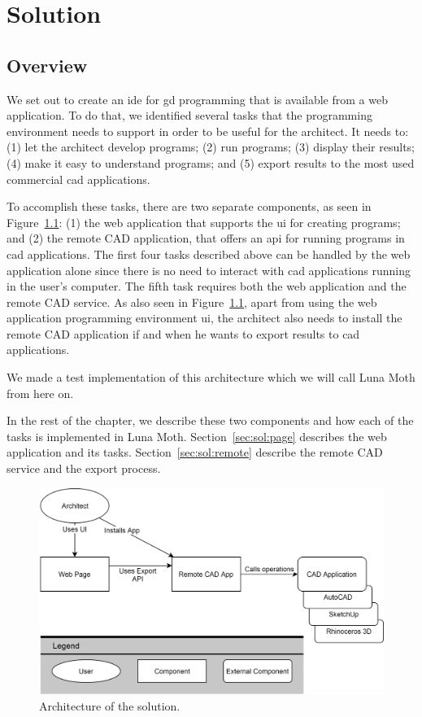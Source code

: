 
\chapter{Solution}
\label{chapter:solution}


\section{Overview}
We set out to create an \gls{ide} for \gls{gd} programming that is available from a web application.
To do that, we identified several tasks that the programming environment needs to support in order to be useful for the architect.
It needs to:
(1) let the architect develop programs;
(2) run programs;
(3) display their results;
(4) make it easy to understand programs;
and (5) export results to the most used commercial \gls{cad} applications.

To accomplish these tasks, there are two separate components, as seen in Figure~\ref{fig:archi:sol}: (1) the web application that supports the \gls{ui} for creating programs; and (2) the remote CAD application, that offers an \gls{api} for running programs in \gls{cad} applications.
The first four tasks described above can be handled by the web application alone since there is no need to interact with \gls{cad} applications running in the user's computer.
The fifth task requires both the web application and the remote CAD service.
As also seen in Figure~\ref{fig:archi:sol}, apart from using the web application programming environment \gls{ui}, the architect also needs to install the remote CAD application if and when he wants to export results to \gls{cad} applications.

We made a test implementation of this architecture which we will call Luna Moth from here on.

In the rest of the chapter, we describe these two components and how each of the tasks is implemented in Luna Moth.
Section~\ref{sec:sol:page} describes the web application and its tasks.
Section~\ref{sec:sol:remote} describe the remote CAD service and the export process.

\begin{figure}
  \centering
  \includegraphics[width=1.0\textwidth]{./images/architecture_overview/architecture_overview}
  \caption{Architecture of the solution.}
  \label{fig:archi:sol}
\end{figure}


